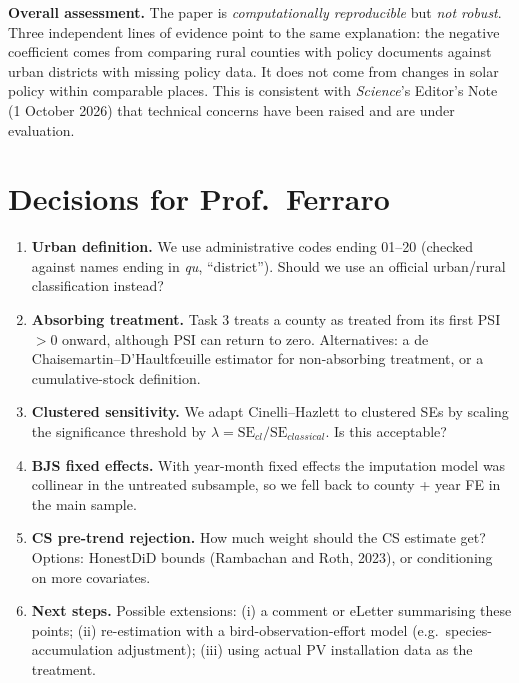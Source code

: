 \documentclass[11pt]{article}
\begin{document}
\begin{whybox}\small
\textbf{Overall assessment.} The paper is \emph{computationally reproducible} but \emph{not robust}. Three independent lines of evidence point to the same explanation: the negative coefficient comes from comparing rural counties with policy documents against urban districts with missing policy data. It does not come from changes in solar policy within comparable places. This is consistent with \textit{Science}'s Editor's Note (1 October 2026) that technical concerns have been raised and are under evaluation.
\end{whybox}

\section{Decisions for Prof.\ Ferraro}
\begin{enumerate}
\item \textbf{Urban definition.} We use administrative codes ending 01--20 (checked against names ending in \textit{qu}, ``district''). Should we use an official urban/rural classification instead?
\item \textbf{Absorbing treatment.} Task 3 treats a county as treated from its first PSI $>0$ onward, although PSI can return to zero. Alternatives: a de Chaisemartin--D'Haultf\oe uille estimator for non-absorbing treatment, or a cumulative-stock definition.
\item \textbf{Clustered sensitivity.} We adapt Cinelli--Hazlett to clustered SEs by scaling the significance threshold by $\lambda = \text{SE}_{cl}/\text{SE}_{classical}$. Is this acceptable?
\item \textbf{BJS fixed effects.} With year-month fixed effects the imputation model was collinear in the untreated subsample, so we fell back to county + year FE in the main sample.
\item \textbf{CS pre-trend rejection.} How much weight should the CS estimate get? Options: HonestDiD bounds (Rambachan and Roth, 2023), or conditioning on more covariates.
\item \textbf{Next steps.} Possible extensions: (i) a comment or eLetter summarising these points; (ii) re-estimation with a bird-observation-effort model (e.g.\ species-accumulation adjustment); (iii) using actual PV installation data as the treatment.
\end{enumerate}

\end{document}
